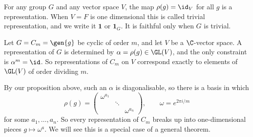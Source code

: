 \begin{example}
	For any group $G$ and any vector space $V$, the map $\rho(g) = \id_V$ for all $g$ is a representation. When $V = F$ is one dimensional this is called  trivial representation, and we write it $\mathbf{1}$ or $\mathbf{1}_G$. It is faithful only when $G$ is trivial.
\end{example}

\begin{example}
	Let $G = C_m = \gen{g}$ be cyclic of order $m$, and let $V$ be a $\C$-vector space. A representation of $G$ is determined by $\alpha = \rho(g) \in \GL(V)$, and the only constraint is $\alpha^m = \id$. So representations of $C_m$ on $V$ correspond exactly to elements of $\GL(V)$ of order dividing $m$.

	By our proposition above, such an $\alpha$ is diagonalisable, so there is a basis in which
	$$\rho(g) = \begin{pmatrix} \omega^{a_1} & & \\ & \ddots & \\ & & \omega^{a_n}\end{pmatrix}, \qquad \omega = e^{2\pi i /m}$$
	for some $a_1, \dots, a_n$. So every representation of $C_m$ breaks up into one-dimensional pieces $g \mapsto \omega^{a}$. We will see this is a special case of a general theorem.
\end{example}


